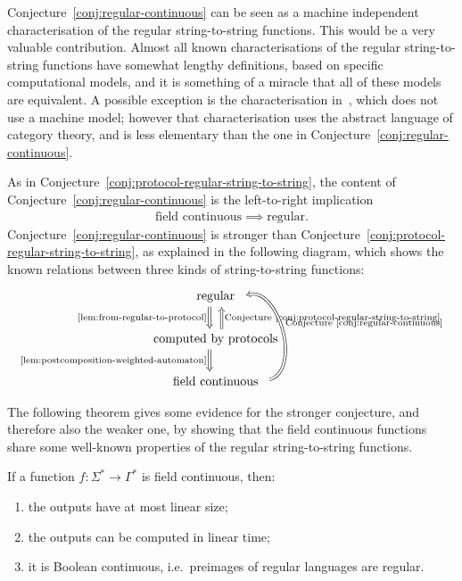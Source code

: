 Conjecture~\ref{conj:regular-continuous} can be seen as  a machine independent characterisation of the regular string-to-string  functions. This would be a very valuable contribution. Almost all known characterisations of the regular string-to-string  functions have somewhat lengthy definitions, based on specific computational models, and it is something of a  miracle that all of these models are equivalent. A possible exception is the characterisation in~\cite{bojanczykTitoRegular23}, which does not use a machine model; however that characterisation uses the abstract language of category theory, and is less elementary than the one in Conjecture~\ref{conj:regular-continuous}.

As in Conjecture~\ref{conj:protocol-regular-string-to-string}, the content of Conjecture~\ref{conj:regular-continuous} is the left-to-right implication
\begin{align*}
\text{field continuous} \implies \text{regular}.
\end{align*}
Conjecture~\ref{conj:regular-continuous} is stronger than Conjecture~\ref{conj:protocol-regular-string-to-string}, as explained in the following diagram, which shows the known relations between three kinds of string-to-string functions:
\[
\begin{tikzcd}
\text{regular}
\ar[d,Rightarrow,shift right=2, "\text{\cref{lem:from-regular-to-protocol}}"']
\\
\text{computed by protocols}
\ar[d,Rightarrow, shift right=2, "\text{\cref{lem:postcomposition-weighted-automaton}}"']
\ar[u,Rightarrow, shift right=2,"\text{Conjecture~\ref{conj:protocol-regular-string-to-string}}"']
\\ 
\text{field continuous} 
\ar[uu,bend right=89, Rightarrow, shift right=2,"\text{Conjecture~\ref{conj:regular-continuous}}"']
\end{tikzcd}
\]


The following theorem gives some evidence for the stronger conjecture,  and
therefore also the weaker one, by showing that the field continuous functions
share some well-known properties of the regular string-to-string functions. 

\begin{theorem}\label{thm:evidence-for-the-conjecture}
    If a function $f : \Sigma^* \to \Gamma^*$ is  field continuous, then:
    \begin{enumerate}
        \item \label{it:linear-size-outputs} the outputs have at most linear size;
        \item \label{it:linear-time-computable} the outputs can be   computed in linear time;
        \item \label{it:regular-preimages} it is Boolean continuous, i.e.~preimages of regular languages are regular.
    \end{enumerate}
\end{theorem}

